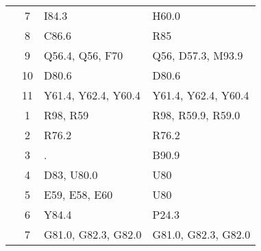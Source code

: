 \begin{table}[htbp]
\begin{tabular}{c c l l}
	 & 7 & I84.3 & H60.0 \\
	 & 8 & C86.6 & R85 \\
	 & 9 & Q56.4, Q56, F70 & Q56, D57.3, M93.9 \\
	 & 10 & D80.6 & D80.6 \\
	 & 11 & Y61.4, Y62.4, Y60.4 & Y61.4, Y62.4, Y60.4 \\
	\addlinespace
	6 & 1 & R98, R59 & R98, R59.9, R59.0 \\
	 & 2 & R76.2 & R76.2 \\
	 & 3 & . & B90.9 \\
	 & 4 & D83, U80.0 & U80 \\
	 & 5 & E59, E58, E60 & U80 \\
	 & 6 & Y84.4 & P24.3 \\
	 & 7 & G81.0, G82.3, G82.0 & G81.0, G82.3, G82.0 \\
	\bottomrule
\end{tabular}
\end{table}

